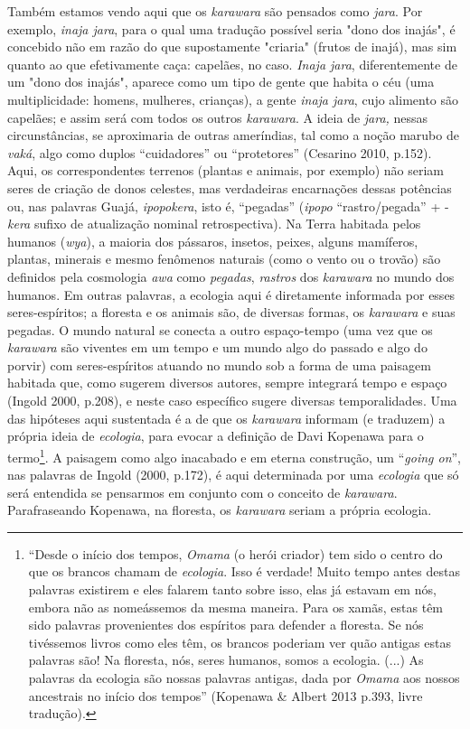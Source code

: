 Também estamos vendo aqui que os \emph{karawara} são pensados como
\emph{jara}. Por exemplo, \emph{inaja jara}, para o qual uma tradução
possível seria "dono dos inajás", é concebido não em razão do que
supostamente "criaria" (frutos de inajá), mas sim quanto ao que
efetivamente caça: capelães, no caso. \emph{Inaja jara}, diferentemente
de um "dono dos inajás", aparece como um tipo de gente que habita o céu
(uma multiplicidade: homens, mulheres, crianças), a gente \emph{inaja
jara}, cujo alimento são capelães; e assim será com todos os outros
\emph{karawara}. A ideia de \emph{jara,} nessas circunstâncias, se
aproximaria de outras ameríndias, tal como a noção marubo de
\emph{vaká}, algo como duplos ``cuidadores'' ou ``protetores'' (Cesarino
2010, p.152). Aqui, os correspondentes terrenos (plantas e animais, por
exemplo) não seriam seres de criação de donos celestes, mas verdadeiras
encarnações dessas potências ou, nas palavras Guajá, \emph{ipopokera},
isto é, ``pegadas'' (\emph{ipopo} ``rastro/pegada'' + -\emph{kera}
sufixo de atualização nominal retrospectiva). Na Terra habitada pelos
humanos (\emph{wya}), a maioria dos pássaros, insetos, peixes, alguns
mamíferos, plantas, minerais e mesmo fenômenos naturais (como o vento ou
o trovão) são definidos pela cosmologia \emph{awa} como \emph{pegadas},
\emph{rastros} dos \emph{karawara} no mundo dos humanos. Em outras
palavras, a ecologia aqui é diretamente informada por esses
seres-espíritos; a floresta e os animais são, de diversas formas, os
\emph{karawara} e suas pegadas. O mundo natural se conecta a outro
espaço-tempo (uma vez que os \emph{karawara} são viventes em um tempo e
um mundo algo do passado e algo do porvir) com seres-espíritos atuando
no mundo sob a forma de uma paisagem habitada que, como sugerem diversos
autores, sempre integrará tempo e espaço (Ingold 2000, p.208), e neste
caso específico sugere diversas temporalidades. Uma das hipóteses aqui
sustentada é a de que os \emph{karawara} informam (e traduzem) a própria
ideia de \emph{ecologia}, para evocar a definição de Davi Kopenawa para
o termo\footnote{``Desde o início dos tempos, \emph{Omama} (o herói
  criador) tem sido o centro do que os brancos chamam de
  \emph{ecologia}. Isso é verdade! Muito tempo antes destas palavras
  existirem e eles falarem tanto sobre isso, elas já estavam em nós,
  embora não as nomeássemos da mesma maneira. Para os xamãs, estas têm
  sido palavras provenientes dos espíritos para defender a floresta. Se
  nós tivéssemos livros como eles têm, os brancos poderiam ver quão
  antigas estas palavras são! Na floresta, nós, seres humanos, somos a
  ecologia. (...) As palavras da ecologia são nossas palavras antigas,
  dada por \emph{Omama} aos nossos ancestrais no início dos tempos''
  (Kopenawa \& Albert 2013 p.393, livre tradução).}. A paisagem como
algo inacabado e em eterna construção, um ``\emph{going on}'', nas
palavras de Ingold (2000, p.172), é aqui determinada por uma
\emph{ecologia} que só será entendida se pensarmos em conjunto com o
conceito de \emph{karawara}. Parafraseando Kopenawa, na floresta, os
\emph{karawara} seriam a própria ecologia.

